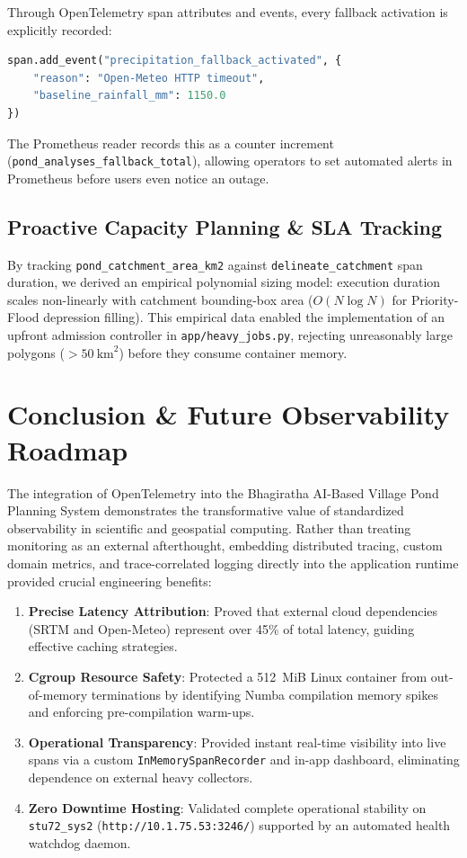\documentclass[11pt,a4paper]{article}
\begin{document}
Through OpenTelemetry span attributes and events, every fallback activation is explicitly recorded:
\begin{lstlisting}[language=Python]
span.add_event("precipitation_fallback_activated", {
    "reason": "Open-Meteo HTTP timeout",
    "baseline_rainfall_mm": 1150.0
})
\end{lstlisting}
The Prometheus reader records this as a counter increment (\texttt{pond\_analyses\_fallback\_total}), allowing operators to set automated alerts in Prometheus before users even notice an outage.

\subsection{Proactive Capacity Planning \& SLA Tracking}
By tracking \texttt{pond\_catchment\_area\_km2} against \texttt{delineate\_catchment} span duration, we derived an empirical polynomial sizing model: execution duration scales non-linearly with catchment bounding-box area ($O(N \log N)$ for Priority-Flood depression filling). This empirical data enabled the implementation of an upfront admission controller in \texttt{app/heavy\_jobs.py}, rejecting unreasonably large polygons ($>50~\text{km}^2$) before they consume container memory.

\section{Conclusion \& Future Observability Roadmap}
\label{sec:conclusion}

The integration of OpenTelemetry into the Bhagiratha AI-Based Village Pond Planning System demonstrates the transformative value of standardized observability in scientific and geospatial computing. Rather than treating monitoring as an external afterthought, embedding distributed tracing, custom domain metrics, and trace-correlated logging directly into the application runtime provided crucial engineering benefits:
\begin{enumerate}[leftmargin=*]
    \item \textbf{Precise Latency Attribution}: Proved that external cloud dependencies (SRTM and Open-Meteo) represent over 45\% of total latency, guiding effective caching strategies.
    \item \textbf{Cgroup Resource Safety}: Protected a 512~MiB Linux container from out-of-memory terminations by identifying Numba compilation memory spikes and enforcing pre-compilation warm-ups.
    \item \textbf{Operational Transparency}: Provided instant real-time visibility into live spans via a custom \texttt{InMemorySpanRecorder} and in-app dashboard, eliminating dependence on external heavy collectors.
    \item \textbf{Zero Downtime Hosting}: Validated complete operational stability on \texttt{stu72\_sys2} (\texttt{http://10.1.75.53:3246/}) supported by an automated health watchdog daemon.
\end{enumerate}
\end{document}
